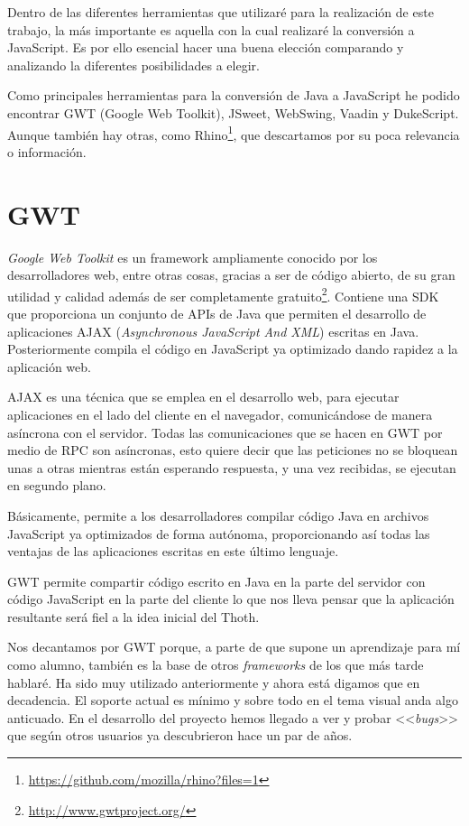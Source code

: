 
Dentro de las diferentes herramientas que utilizaré para la realización de este trabajo, la más importante es aquella con la cual realizaré la conversión a JavaScript. Es por ello esencial hacer una buena elección comparando y analizando la diferentes posibilidades a elegir.

Como principales herramientas para la conversión de Java a JavaScript he podido encontrar GWT (Google Web Toolkit), JSweet, WebSwing, Vaadin y DukeScript. Aunque también hay otras, como Rhino\footnote{\url{https://github.com/mozilla/rhino?files=1}}, que descartamos por su poca relevancia o información.

\section{GWT}

\emph{Google Web Toolkit} es un framework ampliamente conocido por los desarrolladores web, entre otras cosas, gracias a ser de código abierto, de su gran utilidad y calidad además de ser completamente gratuito\footnote{\url{http://www.gwtproject.org/}}.
Contiene una SDK que proporciona un conjunto de APIs de Java que permiten el desarrollo de aplicaciones AJAX (\emph{Asynchronous JavaScript And XML}) escritas en Java. Posteriormente compila el código en JavaScript ya optimizado dando rapidez a la aplicación web. 

AJAX es una técnica que se emplea en el desarrollo web, para ejecutar aplicaciones en el lado del cliente en el navegador, comunicándose de manera asíncrona con el servidor. Todas las comunicaciones que se hacen en GWT por medio de RPC son asíncronas, esto quiere decir que las peticiones no se bloquean unas a otras mientras están esperando respuesta, y una vez recibidas, se ejecutan en segundo plano.

Básicamente, permite a los desarrolladores compilar código Java en archivos JavaScript ya optimizados de forma autónoma, proporcionando así todas las ventajas de las aplicaciones escritas en este último lenguaje. 

GWT permite compartir código escrito en Java en la parte del servidor con código JavaScript en la parte del cliente lo que nos lleva pensar que la aplicación resultante será fiel a la idea inicial del Thoth. 

Nos decantamos por GWT porque, a parte de que supone un aprendizaje para mí como alumno, también es la base de otros \emph{frameworks} de los que más tarde hablaré. Ha sido muy utilizado anteriormente y ahora está digamos que en decadencia. El soporte actual es mínimo y sobre todo en el tema visual anda algo anticuado. En el desarrollo del proyecto hemos llegado a ver  y probar <<\emph{bugs}>> que según otros usuarios ya descubrieron hace un par de años.

